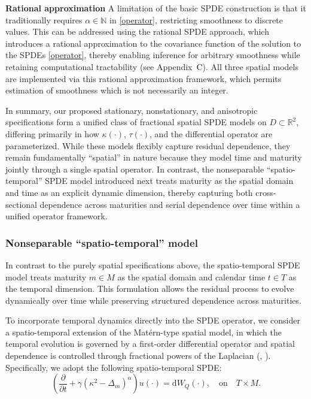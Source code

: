 \documentclass[
  12pt]{article}
\newcommand{\citeay}[1]{\citeauthor{#1}, \citeyear{#1}}
\begin{document}
\textbf{Rational approximation}
A limitation of the basic SPDE construction is that it traditionally requires $\alpha\in\mathbb{N}$ in \eqref{operator}, restricting smoothness to discrete values. This can be addressed using the rational SPDE approach, which introduces a rational approximation to the covariance function of the solution to the SPDEs \eqref{operator}, thereby enabling inference for arbitrary smoothness while retaining computational tractability (see Appendix~C). All three spatial models are implemented via this rational approximation framework, which permits estimation of smoothness which is not necessarily an integer.

In summary, our proposed stationary, nonstationary, and anisotropic specifications form a unified class of fractional spatial SPDE models on $D\subset\mathbb{R}^2$, differing primarily in how $\kappa(\cdot)$, $\tau(\cdot)$, and the differential operator are parameterized. While these models flexibly capture residual dependence, they remain fundamentally ``spatial'' in nature because they model time and maturity jointly through a single spatial operator. In contrast, the nonseparable ``spatio-temporal'' SPDE model introduced next treats maturity as the spatial domain and time as an explicit dynamic dimension, thereby capturing both cross-sectional dependence across maturities and serial dependence over time within a unified operator framework.

\subsubsection{Nonseparable ``spatio-temporal'' model}

In contrast to the purely spatial specifications above, the spatio-temporal SPDE model treats maturity $m \in M$ as the spatial domain and calendar time $t \in T$ as the temporal dimension. This formulation allows the residual process to evolve dynamically over time while preserving structured dependence across maturities.

To incorporate temporal dynamics directly into the SPDE operator, we consider a spatio-temporal extension of the Matérn-type spatial model, in which the temporal evolution is governed by a first-order differential operator and spatial dependence is controlled through fractional powers of the Laplacian (\citeay{lindgren2020diffusion}). Specifically, we adopt the following spatio-temporal SPDE:
\begin{equation}
    \left(\frac{\partial}{\partial t} + \gamma (\kappa^2 - \Delta_m)^{\alpha} \right)u(\cdot) = \mathrm{d}W_Q(\cdot),
    \quad \text{on} \quad T \times M.
    \label{stem}
\end{equation}
\end{document}
